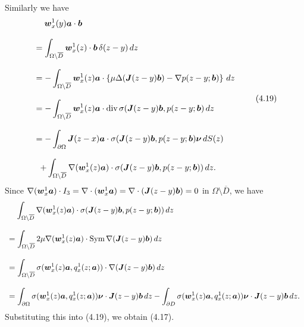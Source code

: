 Similarly we have
$$\begin{array}{l}
\displaystyle
\,\,\,\,\,\,
\mbox{\boldmath $w$}_x^1(y)\mbox{\boldmath $a$}\cdot\mbox{\boldmath $b$}
\\
\\
\displaystyle
=\int_{\Omega\setminus\overline{D}}\mbox{\boldmath $w$}_x^1(z)\cdot\mbox{\boldmath $b$}\,\delta(z-y)\,dz
\\
\\
\displaystyle
=-\int_{\Omega\setminus\overline{D}}\mbox{\boldmath $w$}_x^1(z)\mbox{\boldmath $a$}\cdot
\left\{\mu\Delta(\mbox{\boldmath $J$}(z-y)\mbox{\boldmath $b$})-\nabla p(z-y;\mbox{\boldmath $b$})\right\}\,dz
\\
\\
\displaystyle
=-\int_{\Omega\setminus\overline{D}}\mbox{\boldmath $w$}_x^1(z)\mbox{\boldmath $a$}\cdot
\text{div}\,\sigma(\mbox{\boldmath $J$}(z-y)\mbox{\boldmath $b$},p(z-y;\mbox{\boldmath $b$})\,dz
\\
\\
\displaystyle
=-\int_{\partial\Omega}\mbox{\boldmath $J$}(z-x)\mbox{\boldmath $a$}\cdot
\sigma(\mbox{\boldmath $J$}(z-y)\mbox{\boldmath $b$},p(z-y;\mbox{\boldmath $b$})\mbox{\boldmath $\nu$}\,dS(z)
\\
\\
\displaystyle
\,\,\,
+\int_{\Omega\setminus\overline{D}}\nabla(\mbox{\boldmath $w$}_x^1(z)\mbox{\boldmath $a$})
\cdot\sigma(\mbox{\boldmath $J$}(z-y)\mbox{\boldmath $b$},p(z-y;\mbox{\boldmath $b$}))\,dz.
\end{array}
\tag {4.19}
$$
Since $\nabla(\mbox{\boldmath $w$}_x^1\mbox{\boldmath $a$})\cdot I_3=\nabla\cdot(\mbox{\boldmath $w$}_x^1\mbox{\boldmath $a$})=\nabla\cdot
 (\mbox{\boldmath $J$}(z-y)\mbox{\boldmath $b$})=0$ in
$\Omega\setminus\overline{D}$, we have
$$\begin{array}{l}
\displaystyle
\,\,\,\,\,\,
\int_{\Omega\setminus\overline{D}}\nabla(\mbox{\boldmath $w$}_x^1(z)\mbox{\boldmath $a$})
\cdot\sigma(\mbox{\boldmath $J$}(z-y)\mbox{\boldmath $b$},p(z-y;\mbox{\boldmath $b$}))\,dz
\\
\\
\displaystyle
=\int_{\Omega\setminus\overline{D}}
2\mu\nabla(\mbox{\boldmath $w$}_x^1(z)\mbox{\boldmath $a$})\cdot\text{Sym}\,\nabla(\mbox{\boldmath $J$}(z-y)\mbox{\boldmath $b$})
\,dz
\\
\\
\displaystyle
=\int_{\Omega\setminus\overline{D}}
\sigma(\mbox{\boldmath $w$}_x^1(z)\mbox{\boldmath $a$},q_x^1(z;\mbox{\boldmath $a$}))\cdot\nabla(\mbox{\boldmath $J$}(z-y)\mbox{\boldmath $b$})
\,dz
\\
\\
\displaystyle
=\int_{\partial\Omega}\sigma(\mbox{\boldmath $w$}_x^1(z)\mbox{\boldmath $a$},q_x^1(z;\mbox{\boldmath $a$}))\mbox{\boldmath $\nu$}\cdot
\mbox{\boldmath $J$}(z-y)\mbox{\boldmath $b$}\,dz
-\int_{\partial D}\sigma(\mbox{\boldmath $w$}_x^1(z)\mbox{\boldmath $a$},
q_x^1(z;\mbox{\boldmath $a$}))\mbox{\boldmath $\nu$}\cdot
\mbox{\boldmath $J$}(z-y)\mbox{\boldmath $b$}\,dz.
\end{array}
$$
Substituting this into (4.19), we obtain (4.17).


